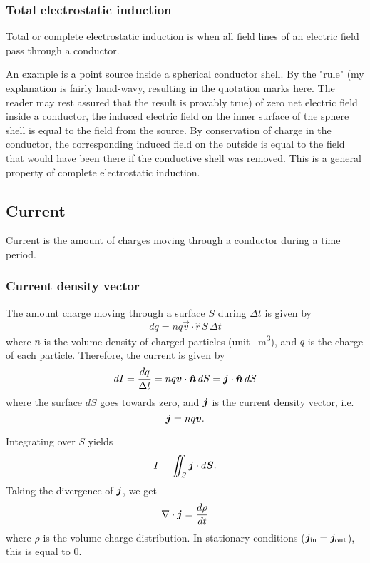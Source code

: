     \subsubsection{Total electrostatic induction}
        Total or complete electrostatic induction is when all field lines of an electric field pass through a conductor.
        
        An example is a point source inside a spherical conductor shell. 
        By the "rule" (my explanation is fairly hand-wavy, resulting in the quotation marks here. 
        The reader may rest assured that the result is provably true) of zero net electric field inside a conductor, 
        the induced electric field on the inner surface of the sphere shell is equal to the field from the source. 
        By conservation of charge in the conductor, 
        the corresponding induced field on the outside is equal to the field that would have been there if the conductive shell was removed. 
        This is a general property of complete electrostatic induction. 
  
\subsection{Current}
    Current is the amount of charges moving through a conductor during a time period. 
    \subsubsection{Current density vector}
        The amount charge moving through a surface $S$ during $\Delta t$ is given by
        \begin{equation}
            dq = nq\vec{v}\cdot \hat{r}\,S \,\Delta t
        \end{equation}
        where $n$ is the volume density of charged particles (unit \si{\per\metre\cubed}), and $q$ is the charge of each particle.
        Therefore, the current is given by
        \begin{equation}
            dI = \frac{dq}{\Delta t} = nq\vec{v}\cdot\hat{n}\, dS = \j\cdot\hat{n}\, dS
        \end{equation}
        where the surface $dS$ goes towards zero, and $\bm{j}$ is the current density vector, i.e.
        \begin{equation}
            \bm{j} = nq\bm{v}.
        \end{equation}
        
        Integrating over $S$ yields
        \begin{equation}
            I = \iint_S \bm{j}\cdot d\bm{S}.
        \end{equation}
        Taking the divergence of $\bm{j}$, we get
        \begin{equation}
            \nabla \cdot \bm{j} = \frac{d\rho}{dt}
        \end{equation}
        where $\rho$ is the volume charge distribution.
        In stationary conditions ($\bm{j}_{\text{in}} = \bm{j}_{\text{out}}$), this is equal to 0. 
    
